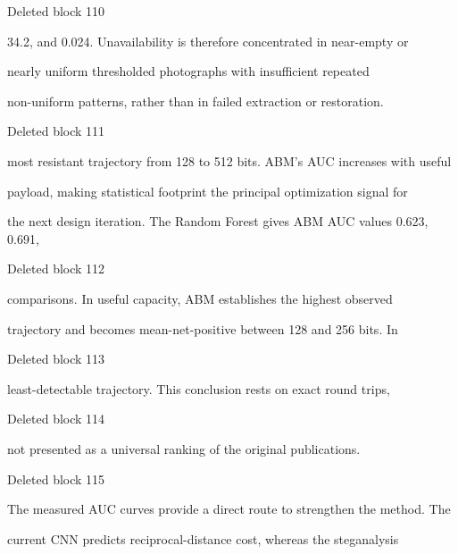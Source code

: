 \documentclass[a4paper,fleqn]{cas-dc}
\newenvironment{RevisionDeletion}{%
  \par\begingroup\color{revisionred}\footnotesize\ttfamily
  \setlength{\parindent}{0pt}\setlength{\parskip}{1pt}\obeyspaces
}{\par\endgroup}
\begin{document}
\begin{RevisionDeletion}
Deleted block 110\par
34.2, and 0.024. Unavailability is therefore concentrated in near-empty or\par
nearly uniform thresholded photographs with insufficient repeated\par
non-uniform patterns, rather than in failed extraction or restoration.\par
\end{RevisionDeletion}

\begin{RevisionDeletion}
Deleted block 111\par
most resistant trajectory from 128 to 512 bits. ABM's AUC increases with useful\par
payload, making statistical footprint the principal optimization signal for\par
the next design iteration. The Random Forest gives ABM AUC values 0.623, 0.691,\par
\end{RevisionDeletion}

\begin{RevisionDeletion}
Deleted block 112\par
comparisons. In useful capacity, ABM establishes the highest observed\par
trajectory and becomes mean-net-positive between 128 and 256 bits. In\par
\end{RevisionDeletion}

\begin{RevisionDeletion}
Deleted block 113\par
least-detectable trajectory. This conclusion rests on exact round trips,\par
\end{RevisionDeletion}

\begin{RevisionDeletion}
Deleted block 114\par
not presented as a universal ranking of the original publications.\par
\end{RevisionDeletion}

\begin{RevisionDeletion}
Deleted block 115\par
The measured AUC curves provide a direct route to strengthen the method. The\par
current CNN predicts reciprocal-distance cost, whereas the steganalysis\par
\end{RevisionDeletion}
\end{document}
